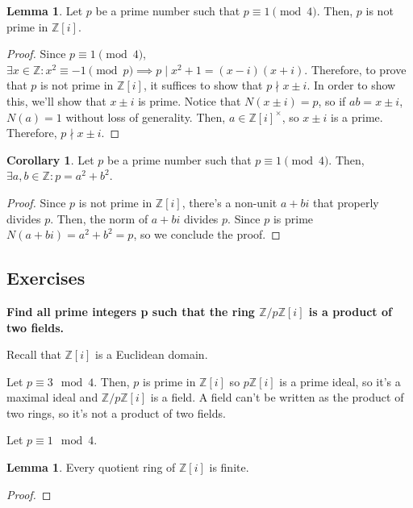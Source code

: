 \documentclass{article}
\theoremstyle{definition}
\newtheorem{lemma}[theorem]{Lemma}
\newtheorem{corollary}{Corollary}[theorem]
\newcommand{\Z}{\mathbb{Z}}
\newcommand{\gauss}{\Z[i]}
\begin{document}
\begin{lemma}
    Let $p$ be a prime number such that $p \equiv 1 \pmod{4}$. Then, $p$ is not prime in $\mathbb{Z}[i]$.
\end{lemma}
\begin{proof}
    Since $p \equiv 1 \pmod{4}$, $\exists x \in \mathbb{Z}: x^{2} \equiv -1 \pmod{p} \implies p \mid x^{2} + 1 = (x - i)(x + i)$. 
    Therefore, to prove that $p$ is not prime in $\mathbb{Z}[i]$, it suffices to 
    show that $p \nmid x \pm i$. In order to show this,
    we'll show that $x \pm i$ is prime. Notice that $N(x \pm i) = p$, so if 
    $ab = x \pm i$, $N(a) = 1$ without loss of generality. Then, $a \in \gauss^{\times}$,
    so $x \pm i$ is a prime. Therefore, $p \nmid x \pm i$.
\end{proof}

\begin{corollary}
    Let $p$ be a prime number such that $p \equiv 1 \pmod{4}$.
    Then, $\exists a,b \in \Z: p = a^{2} + b^{2}$.
\end{corollary}
\begin{proof}
    Since $p$ is not prime in $\gauss$, there's a non-unit $a + bi$ that properly
    divides $p$. Then, the norm of $a + bi$ divides $p$. Since $p$
    is prime $N(a + bi) = a^{2} + b^{2} = p$, so we conclude the proof.
\end{proof}

\subsection{Exercises}

\textbf{Find all prime integers p such that the ring $\Z / p\Z[i]$
is a product of two fields.}

Recall that $\Z[i]$ is a Euclidean domain.

Let $p \equiv 3 \mod{4}$. Then, $p$ is prime in $\gauss$ so
$p\Z[i]$ is a prime ideal, so it's a maximal ideal and 
$\Z / p\Z[i]$ is a field. A field can't be written as the product of
two rings, so it's not a product of two fields.

Let $p \equiv 1 \mod{4}$.

\begin{lemma}
    Every quotient ring of $\Z[i]$ is finite.
\end{lemma}
\begin{proof}
    
\end{proof}

\newpage
\end{document}
